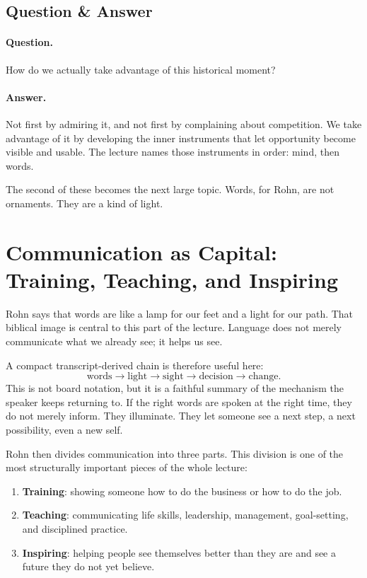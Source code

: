 \subsection{Question \& Answer}

\paragraph{Question.} How do we actually take advantage of this historical moment?

\paragraph{Answer.} Not first by admiring it, and not first by complaining about competition. We take advantage of it by developing the inner instruments that let opportunity become visible and usable. The lecture names those instruments in order: mind, then words.

The second of these becomes the next large topic. Words, for Rohn, are not ornaments. They are a kind of light.

\section{Communication as Capital: Training, Teaching, and Inspiring}

Rohn says that words are like a lamp for our feet and a light for our path. That biblical image is central to this part of the lecture. Language does not merely communicate what we already see; it helps us see.

A compact transcript-derived chain is therefore useful here:
\begin{equation}
\text{words} \to \text{light} \to \text{sight} \to \text{decision} \to \text{change}.
\end{equation}
This is not board notation, but it is a faithful summary of the mechanism the speaker keeps returning to. If the right words are spoken at the right time, they do not merely inform. They illuminate. They let someone see a next step, a next possibility, even a new self.

Rohn then divides communication into three parts. This division is one of the most structurally important pieces of the whole lecture:
\begin{enumerate}
\item \textbf{Training}: showing someone how to do the business or how to do the job.
\item \textbf{Teaching}: communicating life skills, leadership, management, goal-setting, and disciplined practice.
\item \textbf{Inspiring}: helping people see themselves better than they are and see a future they do not yet believe.
\end{enumerate}

